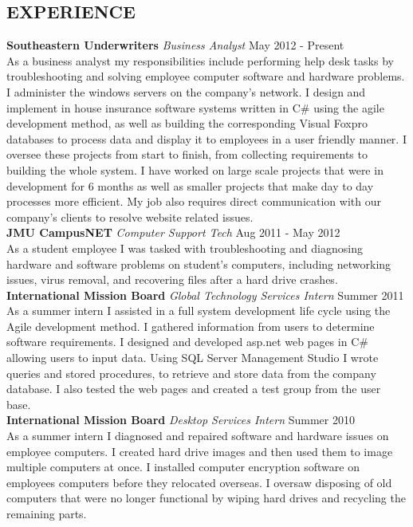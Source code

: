 \documentclass[line, margin]{res}
\begin{document}
\begin{resume}
\section{EXPERIENCE} 
\textbf{Southeastern Underwriters} \textit{Business Analyst} \hfill May 2012 - Present \\
As a business analyst my responsibilities include performing help desk tasks by troubleshooting and solving employee computer software and hardware problems. I administer the windows servers on the company's network. I design and implement in house insurance software systems written in C\# using the agile development method, as well as building the corresponding Visual Foxpro databases to process data and display it to employees in a user friendly manner. I oversee these projects from start to finish, from collecting requirements to building the whole system. I have worked on large scale projects that were in development for 6 months as well as smaller projects that make day to day processes more efficient. My job also requires direct communication with our company's clients to resolve website related issues.\\ [10pt]
\textbf{JMU CampusNET} \textit{Computer Support Tech} \hfill Aug 2011 - May 2012 \\
As a student employee I was tasked with troubleshooting and diagnosing hardware and software problems on student's computers, including networking issues, virus removal, and recovering files after a hard drive crashes.\\ [10pt]
\newpage
\textbf{International Mission Board} \textit{Global Technology Services Intern} \hfill Summer 2011 \\
As a summer intern I assisted in a full system development life cycle using the Agile development method. I gathered information from users to determine software requirements. I designed and developed asp.net web pages in C\# allowing users to input data. Using SQL Server Management Studio I wrote queries and stored procedures, to retrieve and store data from the company database. I also tested the web pages and created a test group from the user base.\\ [10pt]
\textbf{International Mission Board} \textit{Desktop Services Intern} \hfill Summer 2010 \\
As a summer intern I diagnosed and repaired software and hardware issues on employee computers. I created hard drive images and then used them to image multiple computers at once. I installed computer encryption software on employees computers before they relocated overseas. I oversaw disposing of old computers that were no longer functional by wiping hard drives and recycling the remaining parts. \\ [10pt]


\end{resume}
\end{document}

